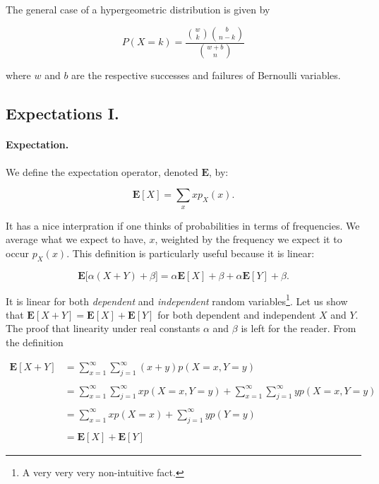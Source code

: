 \documentclass[12pt]{article}
\begin{document}
The general case of a hypergeometric distribution is given by

\begin{equation}
P(X = k) = 
\frac{ {w \choose k} {b \choose n - k} }
{ {w + b \choose n} }
\end{equation}

\noindent
where $w$ and $b$ are the respective successes and failures of Bernoulli variables.

\subsection{Expectations I.}

\paragraph{Expectation.} We define the expectation operator, denoted $\mathbf{E}$, by:

\begin{equation}
\mathbf{E} [ X ]  = \sum_{x} x p_{X} (x) .
\end{equation}

\noindent
It has a nice interpration if one thinks of probabilities in terms of frequencies.
We average what we expect to have, $x$, weighted by the frequency we expect it to occur $p_{X}(x)$.
This definition is particularly useful because it is linear:

\begin{equation}
\mathbf{E} \bigg[  \alpha \left( X + Y \right) + \beta \bigg] = 
\alpha \mathbf{E} [X] + \beta +
\alpha \mathbf{E} [Y] + \beta.
\end{equation}

\noindent
It is linear for both \textit{dependent} and \textit{independent} random variables\footnote{A very very very non-intuitive fact.}.
Let us show that $\mathbf{E} [ X + Y ] = \mathbf{E} [ X ] + \mathbf{E} [ Y ]$ for both dependent and independent $X$ and $Y$.
The proof that linearity under real constants $\alpha$ and $\beta$ is left for the reader.
From the definition

\begin{align}
\mathbf{E} [ X + Y ] &=
\sum_{x = 1}^{\infty} \sum_{j = 1}^{\infty} (x + y) p (X = x, Y = y)
\nonumber \\
\nonumber \\
&= \sum_{x = 1}^{\infty} \sum_{j = 1}^{\infty} x p (X = x, Y = y) 
+
\sum_{x = 1}^{\infty} \sum_{j = 1}^{\infty} y p (X = x, Y = y)
\nonumber \\
\nonumber \\
&= \sum_{x = 1}^{\infty}  x p (X = x) 
+
\sum_{j = 1}^{\infty} y p (Y = y)
\nonumber \\
\nonumber \\
&= \mathbf{E} [ X ] + \mathbf{E} [ Y ] 
\end{align}
\end{document}

